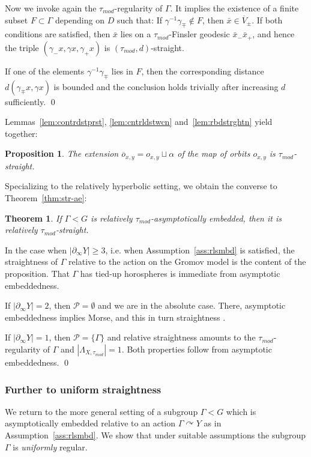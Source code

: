 \documentclass[12pt]{article}
\theoremstyle{boldplain}
\newtheorem{prop}[equation]{Proposition}
\newtheorem{thm}[equation]{Theorem}
\theoremstyle{bolddefinition}
\numberwithin{equation}{section}
\def\al{\alpha}
\def\ga{\gamma}
\def\Ga{\Gamma}
\def\acts{\curvearrowright}
\def\geo{\partial_{\infty}}
\def\LaXt{\Lambda_{X,\tau_{mod}}}
\def\ol{\overline}
\def\taumod{\tau_{mod}}
\begin{document}
Now we invoke again the $\taumod$-regularity of $\Ga$.
It implies the existence of a finite subset $F\subset\Ga$ 
depending on $D$ such that:
If $\ga^{-1}\ga_{\mp}\not\in F$,
then $\bar x\in\ol V_{\pm}$.
If both conditions are satisfied, then 
$\bar x$ lies on a $\taumod$-Finsler geodesic $\bar x_-\bar x_+$, 
and hence 
the triple $(\ga_- x, \ga x, \ga_+ x)$ is $(\taumod,d)$-straight.

If one of the elements $\ga^{-1}\ga_{\mp}$ lies in $F$,
then the corresponding distance $d(\ga_{\mp}x,\ga x)$ is bounded 
and the conclusion holds trivially after increasing $d$ sufficiently.
\qed

\medskip
Lemmas~\ref{lem:contrdstprst}, \ref{lem:cntrldstwcn} and~\ref{lem:rbdstrghtn} yield together:
\begin{prop}
\label{prop:rbdstrght}
The extension $\ol o_{x,y}=o_{x,y}\sqcup\al$ of the map of orbits $o_{x,y}$ is $\taumod$-straight.
\end{prop}

Specializing to the relatively hyperbolic setting,
we obtain the converse to Theorem~\ref{thm:str-ae}:

\begin{thm}
\label{thm:rlsmbrlstr}
If $\Ga<G$ is relatively $\taumod$-asymptotically embedded, then it is relatively $\taumod$-straight.
\end{thm}
\proof
In the case when $|\geo Y|\geq3$,
i.e. when Assumption~\ref{ass:rlsmbd} is satisfied,
the straightness of $\Ga$ relative to the action on the Gromov model is the content of the proposition.
That $\Ga$ has tied-up horospheres is immediate from asymptotic embeddedness.

If $|\geo Y|=2$, then ${\mathcal P}=\emptyset$ and we are in the absolute case.
There, asymptotic embeddedness implies Morse, and this in turn straightness \cite{anolec}.

If $|\geo Y|=1$, then ${\mathcal P}=\{\Ga\}$ 
and relative straightness amounts to the $\taumod$-regularity of $\Ga$ and $|\LaXt|=1$.
Both properties follow from asymptotic embeddedness.
\qed


\subsubsection{Further to uniform straightness}\label{sec:mor-uniform}

We return to the more general setting of a subgroup $\Ga<G$ which is asymptotically embedded relative to an action $\Ga\acts Y$
as in Assumption~\ref{ass:rlsmbd}.
We show that under suitable assumptions the subgroup $\Ga$ is {\em uniformly} regular.
\end{document}

